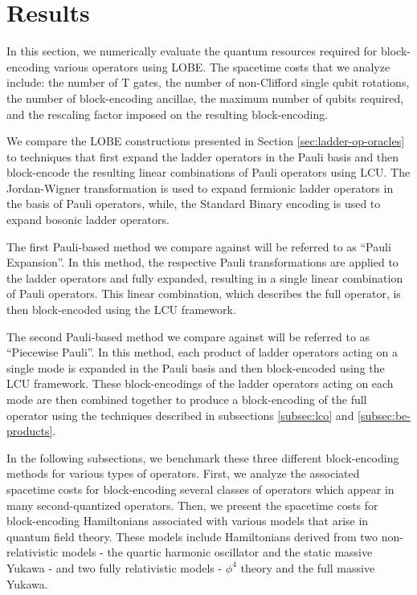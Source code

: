 \section{Results}
\label{sec:results}

In this section, we numerically evaluate the quantum resources required for block-encoding various operators using LOBE.
The spacetime costs that we analyze include: the number of T gates, the number of non-Clifford single qubit rotations, the number of block-encoding ancillae, the maximum number of qubits required, and the rescaling factor imposed on the resulting block-encoding.

We compare the LOBE constructions presented in Section \ref{sec:ladder-op-oracles} to techniques that first expand the ladder operators in the Pauli basis and then block-encode the resulting linear combinations of Pauli operators using LCU.
The Jordan-Wigner transformation \cite{jordan-wigner} is used to expand fermionic ladder operators in the basis of Pauli operators, while, the Standard Binary encoding \cite{standard-binary} is used to expand bosonic ladder operators.

The first Pauli-based method we compare against will be referred to as ``Pauli Expansion''.
In this method, the respective Pauli transformations are applied to the ladder operators and fully expanded, resulting in a single linear combination of Pauli operators.
This linear combination, which describes the full operator, is then block-encoded using the LCU framework.

The second Pauli-based method we compare against will be referred to as ``Piecewise Pauli''.
In this method, each product of ladder operators acting on a single mode is expanded in the Pauli basis and then block-encoded using the LCU framework.
These block-encodings of the ladder operators acting on each mode are then combined together to produce a block-encoding of the full operator using the techniques described in subsections \ref{subsec:lco} and \ref{subsec:be-products}.

In the following subsections, we benchmark these three different block-encoding methods for various types of operators.
First, we analyze the associated spacetime costs for block-encoding several classes of operators which appear in many second-quantized operators.
Then, we present the spacetime costs for block-encoding Hamiltonians associated with various models that arise in quantum field theory.
These models include Hamiltonians derived from two non-relativistic models - the quartic harmonic oscillator and the static massive Yukawa - and two fully relativistic models - $\phi^4$ theory and the full massive Yukawa.

